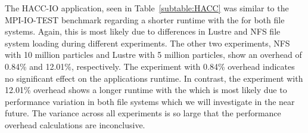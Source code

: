 
The HACC-IO application, seen in Table~\ref{subtable:HACC} was similar to the MPI-IO-TEST 
benchmark regarding a shorter runtime with the \connector{} for both file systems. Again, 
this is most likely due to differences in Lustre and NFS file system loading during different
experiments. The other two experiments, NFS with 10 million particles and Lustre with 
5 million particles, show an overhead of 0.84\% and 12.01\%, respectively. The experiment 
with 0.84\% overhead indicates no significant effect on the applications runtime. 
In contrast, the experiment with 12.01\% overhead shows a longer runtime with the 
\connector{} which is most likely due to performance variation in both file systems 
which we will investigate in the near future. The variance across all experiments is 
so large that the performance overhead calculations are inconclusive. 



